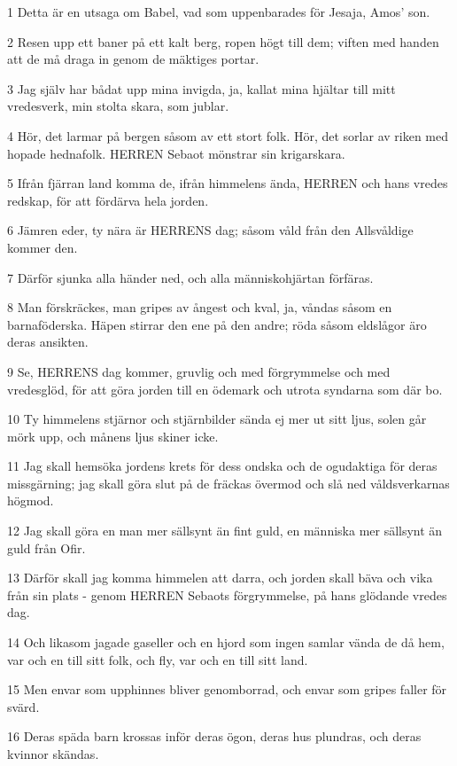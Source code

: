 \par 1 Detta är en utsaga om Babel, vad som uppenbarades för Jesaja, Amos' son.
\par 2 Resen upp ett baner på ett kalt berg, ropen högt till dem; viften med handen att de må draga in genom de mäktiges portar.
\par 3 Jag själv har bådat upp mina invigda, ja, kallat mina hjältar till mitt vredesverk, min stolta skara, som jublar.
\par 4 Hör, det larmar på bergen såsom av ett stort folk. Hör, det sorlar av riken med hopade hednafolk. HERREN Sebaot mönstrar sin krigarskara.
\par 5 Ifrån fjärran land komma de, ifrån himmelens ända, HERREN och hans vredes redskap, för att fördärva hela jorden.
\par 6 Jämren eder, ty nära är HERRENS dag; såsom våld från den Allsvåldige kommer den.
\par 7 Därför sjunka alla händer ned, och alla människohjärtan förfäras.
\par 8 Man förskräckes, man gripes av ångest och kval, ja, våndas såsom en barnaföderska. Häpen stirrar den ene på den andre; röda såsom eldslågor äro deras ansikten.
\par 9 Se, HERRENS dag kommer, gruvlig och med förgrymmelse och med vredesglöd, för att göra jorden till en ödemark och utrota syndarna som där bo.
\par 10 Ty himmelens stjärnor och stjärnbilder sända ej mer ut sitt ljus, solen går mörk upp, och månens ljus skiner icke.
\par 11 Jag skall hemsöka jordens krets för dess ondska och de ogudaktiga för deras missgärning; jag skall göra slut på de fräckas övermod och slå ned våldsverkarnas högmod.
\par 12 Jag skall göra en man mer sällsynt än fint guld, en människa mer sällsynt än guld från Ofir.
\par 13 Därför skall jag komma himmelen att darra, och jorden skall bäva och vika från sin plats - genom HERREN Sebaots förgrymmelse, på hans glödande vredes dag.
\par 14 Och likasom jagade gaseller och en hjord som ingen samlar vända de då hem, var och en till sitt folk, och fly, var och en till sitt land.
\par 15 Men envar som upphinnes bliver genomborrad, och envar som gripes faller för svärd.
\par 16 Deras späda barn krossas inför deras ögon, deras hus plundras, och deras kvinnor skändas.
